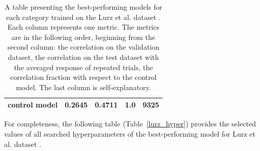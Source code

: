 \begin{table}[H]
\begin{tabular}{|c|c|c|c|c|}
		control model                                                     & 0.2645                                                      & 0.4711                                                       & 1.0                                                              & 9325                                                                             \\ \hline
	\end{tabular}
\caption{A table presenting the best-performing models for each category trained on the Lurz et al. dataset \citep{lurz2021generalization}. Each column represents one metric. The metrics are in the following order, beginning from the second column: the correlation on the validation dataset, the correlation on the test dataset with the averaged response of repeated trials, the correlation fraction with respect to the control model. The last column is self-explanatory.}\label{results_lurz}
\end{table}


For completeness, the following table (Table~\ref{lurz_hyper}) provides the selected values of all searched hyperparameters of the best-performing model for Lurz et al. dataset \citep{lurz2021generalization}.


